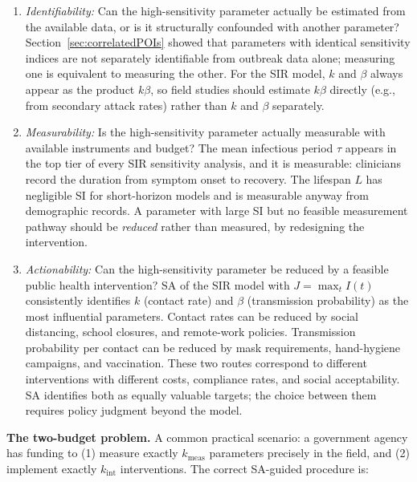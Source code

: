 \begin{enumerate}
\item \textit{Identifiability:} Can the high-sensitivity parameter
      actually be estimated from the available data, or is it
      structurally confounded with another parameter?
      Section~\ref{sec:correlatedPOIs} showed that parameters
      with identical sensitivity indices are not separately identifiable
      from outbreak data alone; measuring one is equivalent
      to measuring the other.
      For the SIR model, $k$ and $\beta$ always appear as the product
      $k\beta$, so field studies should estimate $k\beta$ directly
      (e.g., from secondary attack rates) rather than $k$ and $\beta$
      separately.

\item \textit{Measurability:} Is the high-sensitivity parameter
      actually measurable with available instruments and budget?
      The mean infectious period $\tau$ appears in the top tier
      of every SIR sensitivity analysis, and it is measurable:
      clinicians record the duration from symptom onset to recovery.
      The lifespan $L$ has negligible SI for short-horizon models
      and is measurable anyway from demographic records.
      A parameter with large SI but no feasible measurement pathway
      should be \emph{reduced} rather than measured, by redesigning
      the intervention.

\item \textit{Actionability:} Can the high-sensitivity parameter
      be reduced by a feasible public health intervention?
      SA of the SIR model with $J = \max_t I(t)$ consistently identifies
      $k$ (contact rate) and $\beta$ (transmission probability) as the
      most influential parameters.
      Contact rates can be reduced by social distancing, school closures,
      and remote-work policies.
      Transmission probability per contact can be reduced by mask
      requirements, hand-hygiene campaigns, and vaccination.
      These two routes correspond to different interventions with
      different costs, compliance rates, and social acceptability.
      SA identifies both as equally valuable targets; the choice between
      them requires policy judgment beyond the model.
\end{enumerate}

\textbf{The two-budget problem.}
A common practical scenario: a government agency has funding to
(1) measure exactly $k_{\text{meas}}$ parameters precisely in the field,
and (2) implement exactly $k_{\text{int}}$ interventions.
The correct SA-guided procedure is:

